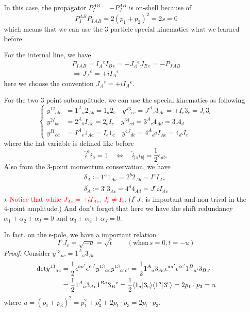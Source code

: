 \documentclass[12pt]{article}
\newcommand{\inner}[2]{\langle #1 | #2 \rangle}
\begin{document}
In this case, the propagator $P_I^{AB}=-P_J^{AB}$ is on-shell because of 
\begin{equation}
    P_I^{AB}P_{I\,AB}=2(p_1+p_2)^2=2s=0
\end{equation}
which means that we can use the 3 particle special kinematics what we learned before.

For the internal line, we have
\begin{gather}
    P_{I\,AB}=I_A{}^eI_{B\,e}=-J_A{}^eJ_{B\,e}=-P_{J\,AB}\\
    \Rightarrow J_A{}^e=\pm iI_A{}^e
\end{gather}
here we choose the convention $J_A{}^e=+ iI_A{}^e$.

For the two 3 point subamplitude, we can use the special kinematics as following
\begin{equation}
\left\{
\begin{aligned}
    y^{12}{}_{ab}&= 1^A{}_a2_{Ab}=1_a2_b\quad y^{J3}{}_{ec}= J^A{}_e3_{Ac}=+I_e3_c=J_e3_c  \\
    y^{2I}{}_{be}&= 2^A{}_bI_{Ae}=2_bI_e\quad y^{34}{}_{cd}= 3^A{}_c4_{Ad}=3_c4_d \\
    y^{I1}{}_{ea}&= I^A{}_e1_{Aa}=I_e1_a\quad y^{4J}{}_{de}= 4^A{}_diI_{Ae}=4_dJ_e
\end{aligned}
\right.
\end{equation}
where the hat variable is defined like before
\begin{equation}
    \hat{i}^ai_a=1\quad \Leftrightarrow \quad \hat{i}_{[a}i_{b]}=\frac{1}{2}\epsilon_{ab}.
    \label{143}
\end{equation}
Also from the 3-point momentum conservation, we have 
\begin{gather}
    \delta_A\coloneqq 1^a 1_{Aa}=2^b 2_{Ab}=I^e I_{Ae}\\
    \delta^\prime_A\coloneqq 3^c 3_{Ac}=4^d 4_{Ad}=J^e iI_{Ae}
\end{gather}
\textcolor{red}{$\star$ Notice that while $J_{Ae}=+iI_{Ae}$, $J_e\neq I_e$.} ($I^eJ_e$ is important and non-trival in the 4-point amplitude.)
And don't forget that here we have the shift redundancy $\alpha_1+\alpha_2+\alpha_I=0$ and $\alpha_3+\alpha_4+\alpha_J=0$.

In fact. on the s-pole, we have a important relation
\begin{equation}
    I^eJ_e=\sqrt{-u}=\sqrt{t}\qquad (\text{when} \,s=0, t=-u)
\end{equation}
\textit{Proof:} \qquad Consider $y^{13}{}_{ac}=1^A{}_a3_{Ac}$
\begin{align}
    \mathrm{det}y^{13}{}_{ac}&=\frac{1}{2}\epsilon^{aa^\prime}\epsilon^{cc^\prime}y^{13}{}_{ac}y^{13}{}_{a^{\prime} c^{\prime}}= \frac{1}{2}1^A{}_a 3_{Ac}\epsilon^{aa^\prime}\epsilon^{cc^\prime} 1^B{}_{a^\prime}3_{Bc^\prime} \notag \\
    &=\frac{1}{2}1^A{}_a 3_{Ac}1^{Ba} 3_B{}^c=\frac{1}{2}\inner{1_a}{3_c}\inner{1^a}{3^c}=2p_1\cdot p_3=u
\end{align}
where $u=(p_1+p_3)^2=p_1^2+p_3^2+2p_1\cdot p_3=2p_1\cdot p_3$.
\end{document}

